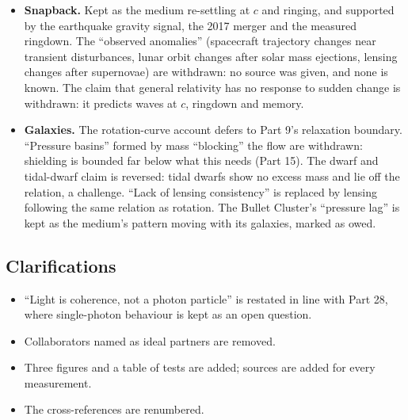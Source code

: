 \documentclass[11pt,a4paper]{article}
\begin{document}
\begin{itemize}
\item \textbf{Snapback.} Kept as the medium re-settling at $c$ and ringing, and supported by the earthquake gravity signal, the 2017 merger and the measured ringdown. The ``observed anomalies'' (spacecraft trajectory changes near transient disturbances, lunar orbit changes after solar mass ejections, lensing changes after supernovae) are withdrawn: no source was given, and none is known. The claim that general relativity has no response to sudden change is withdrawn: it predicts waves at $c$, ringdown and memory.
\item \textbf{Galaxies.} The rotation-curve account defers to Part 9's relaxation boundary. ``Pressure basins'' formed by mass ``blocking'' the flow are withdrawn: shielding is bounded far below what this needs (Part 15). The dwarf and tidal-dwarf claim is reversed: tidal dwarfs show no excess mass and lie off the relation, a challenge. ``Lack of lensing consistency'' is replaced by lensing following the same relation as rotation. The Bullet Cluster's ``pressure lag'' is kept as the medium's pattern moving with its galaxies, marked as owed.
\end{itemize}

\subsection*{Clarifications}
\begin{itemize}
\item ``Light is coherence, not a photon particle'' is restated in line with Part 28, where single-photon behaviour is kept as an open question.
\item Collaborators named as ideal partners are removed.
\item Three figures and a table of tests are added; sources are added for every measurement.
\item The cross-references are renumbered.
\end{itemize}


\end{document}
